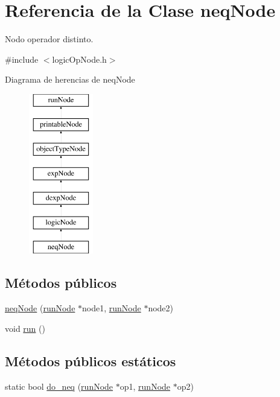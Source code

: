 \hypertarget{classneqNode}{\section{Referencia de la Clase neq\-Node}
\label{classneqNode}
}


Nodo operador distinto.  




{\ttfamily \#include $<$logic\-Op\-Node.\-h$>$}

Diagrama de herencias de neq\-Node\begin{figure}[H]
\begin{center}
\leavevmode
\includegraphics[height=7.000000cm]{classneqNode}
\end{center}
\end{figure}
\subsection*{Métodos públicos}
\begin{DoxyCompactItemize}
\item 
\hyperlink{classneqNode_a8a69d8ac9acf08b6c81c1e6b0a3bbccf}{neq\-Node} (\hyperlink{classrunNode}{run\-Node} $\ast$node1, \hyperlink{classrunNode}{run\-Node} $\ast$node2)
\item 
void \hyperlink{classneqNode_a88cbbfd96d5962f40fd2d5ea42da9de9}{run} ()
\end{DoxyCompactItemize}
\subsection*{Métodos públicos estáticos}
\begin{DoxyCompactItemize}
\item 
static bool \hyperlink{classneqNode_aac8835195e639b47e32a61b252bfe0dd}{do\-\_\-neq} (\hyperlink{classrunNode}{run\-Node} $\ast$op1, \hyperlink{classrunNode}{run\-Node} $\ast$op2)
\end{DoxyCompactItemize}

